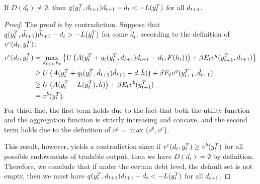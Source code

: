 \begin{proposition}
    \label{prop1}
    If $D(d_t) \neq \emptyset$, then $q(y^T_{t}, d_{t+1})d_{t+1} - d_t < -L(y^T_{t})$ for all $d_{t+1}$.
\end{proposition}
\begin{proof}
    The proof is by contradiction. Suppose that $q(y^T_{t}, \tilde{d}_{t+1})\tilde{d}_{t+1} - d_t > -L(y^T_{t})$ for some $\tilde{d}_t$, according to the definition of $v^c(d_t, y^T_{t})$:
    \begin{align*}
        v^c(d_t, y^T_{t}) &= \max_{d_{t+1}, h_t} \left\{
            U\left( A(y^T_{t} + q_t(y^T_{t}, d_{t+1}) d_{t+1} - d_t, F(h_t)) \right) +
            \beta E_t v^g(y^T_{t+1}, d_{t+1})
         \right\}\\
         &\ge U\left( A(y^T_{t} + q_t(y^T_{t}, \tilde{d}_{t+1}) \tilde{d}_{t+1} - d, \bar{h}) \right) +
            \beta E_t v^g(y^T_{t+1}, \tilde{d}_{t+1}) \\
         &\ge U\left( A(y^T_{t} -L(y^T_{t}), \bar{h}) \right) +
            \beta E_t v^b(y^T_{t+1}) \\
        &\equiv v^b(y^T_{t}).
    \end{align*}
    For third line, the first term holds due to the fact that both the utility function and the aggregation function is strictly increasing and concave, and the second term holds due to the definition of  $v^g = \max\{v^b, v^c\}$.

    This result, however, yields a contradiction since if $v^c(d_t, y^T_{t}) \ge v^b(y^T_{t})$ for all possible endowments of tradable output, then we have $D(d_t) = \emptyset$ by definition. Therefore, we conclude that if under the certain debt level, the default set is not empty, then we must have $q(y^T_{t}, d_{t+1})d_{t+1} - d_t < -L(y^T_{t})$ for all $d_{t+1}$.
\end{proof}

